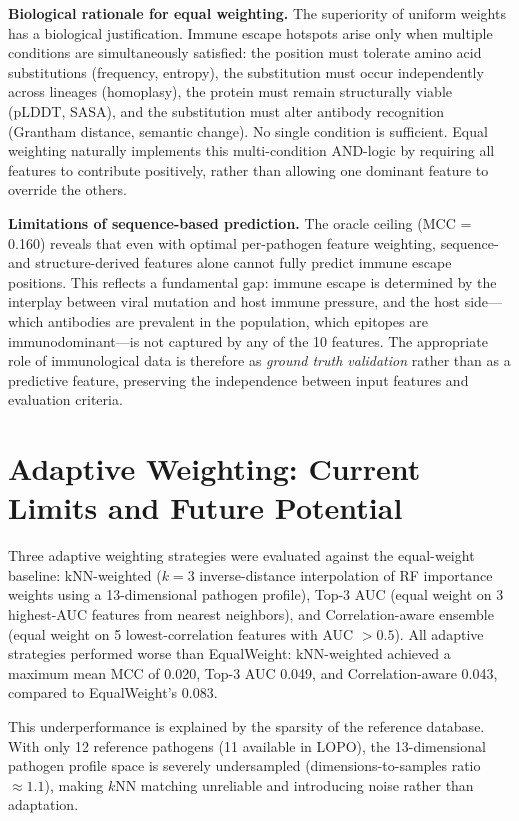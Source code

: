 \textbf{Biological rationale for equal weighting.}
The superiority of uniform weights has a biological justification.
Immune escape hotspots arise only when multiple conditions are simultaneously satisfied: the position must tolerate amino acid substitutions (frequency, entropy), the substitution must occur independently across lineages (homoplasy), the protein must remain structurally viable (pLDDT, SASA), and the substitution must alter antibody recognition (Grantham distance, semantic change).
No single condition is sufficient.
Equal weighting naturally implements this multi-condition AND-logic by requiring all features to contribute positively, rather than allowing one dominant feature to override the others.

\textbf{Limitations of sequence-based prediction.}
The oracle ceiling (MCC = 0.160) reveals that even with optimal per-pathogen feature weighting, sequence- and structure-derived features alone cannot fully predict immune escape positions.
This reflects a fundamental gap: immune escape is determined by the interplay between viral mutation and host immune pressure, and the host side---which antibodies are prevalent in the population, which epitopes are immunodominant---is not captured by any of the 10 features.
The appropriate role of immunological data is therefore as \textit{ground truth validation} rather than as a predictive feature, preserving the independence between input features and evaluation criteria.

\section{Adaptive Weighting: Current Limits and Future Potential}
\label{sec:adapt_limits}

Three adaptive weighting strategies were evaluated against the equal-weight baseline: kNN-weighted ($k{=}3$ inverse-distance interpolation of RF importance weights using a 13-dimensional pathogen profile), Top-3 AUC (equal weight on 3 highest-AUC features from nearest neighbors), and Correlation-aware ensemble (equal weight on 5 lowest-correlation features with AUC $> 0.5$).
All adaptive strategies performed worse than EqualWeight: kNN-weighted achieved a maximum mean MCC of 0.020, Top-3 AUC 0.049, and Correlation-aware 0.043, compared to EqualWeight's 0.083.

This underperformance is explained by the sparsity of the reference database.
With only 12 reference pathogens (11 available in LOPO), the 13-dimensional pathogen profile space is severely undersampled (dimensions-to-samples ratio $\approx 1.1$), making $k$NN matching unreliable and introducing noise rather than adaptation.

